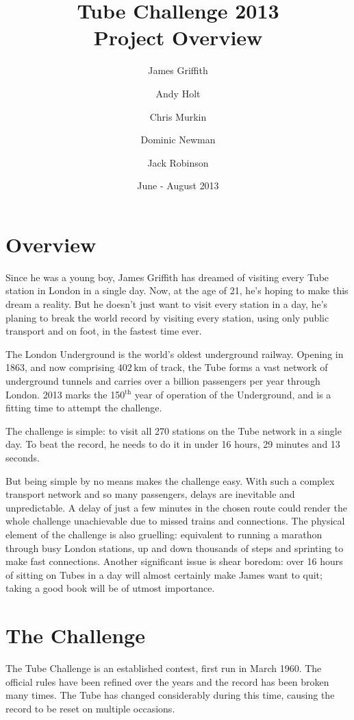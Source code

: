 \documentclass[a4paper,11pt]{article}  %
\title{Tube Challenge 2013\\Project Overview}
\author{James Griffith \and Andy Holt \and Chris Murkin \and Dominic
  Newman \and Jack Robinson}
\date{June - August 2013}
\begin{document}
\maketitle

\section*{Overview}

Since he was a young boy, James Griffith has dreamed of visiting every
Tube station in London in a single day. Now, at the age of 21, he's
hoping to make this dream a reality. But he doesn't just want to visit
every station in a day, he's planing to break the world record by
visiting every station, using only public transport and on foot, in
the fastest time ever.

The London Underground is the world's oldest underground
railway. Opening in 1863, and now comprising $402\,\mathrm{km}$ of
track, the Tube forms a vast network of underground tunnels and
carries over a billion passengers per year through London. 2013 marks
the 150$^{\mathrm{th}}$ year of operation of the Underground, and is a
fitting time to attempt the challenge.

The challenge is simple: to visit all 270 stations on the Tube network
in a single day. To beat the record, he needs to do it in
under 16 hours, 29 minutes and 13 seconds.

But being simple by no means makes the challenge easy. With such a
complex transport network and so many passengers, delays are
inevitable and unpredictable. A delay of just a few minutes in the
chosen route could render the whole challenge unachievable due to
missed trains and connections. The physical element of the challenge
is also gruelling: equivalent to running a marathon through busy
London stations, up and down thousands of steps and sprinting to make
fast connections. Another significant issue is shear boredom: over 16
hours of sitting on Tubes in a day will almost certainly make James
want to quit; taking a good book will be of utmost importance.

\section*{The Challenge}

The Tube Challenge is an established contest, first run in March
1960. The official rules have been refined over the years and the
record has been broken many times. The Tube has changed considerably
during this time, causing the record to be reset on multiple
occasions.
\end{document}
